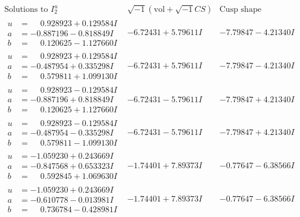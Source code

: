 \documentclass[1p]{elsarticle_modified}
\theoremstyle{definition}
\newcommand{\I}{\sqrt{-1}}
\begin{document}
$$\begin{array}{c|c|c}  
\text{Solutions to }I^u_{2}& \I (\text{vol} + \sqrt{-1}CS) & \text{Cusp shape}\\
 \hline 
\begin{aligned}
u &= \phantom{-}0.928923 + 0.129584 I \\
a &= -0.887196 - 0.818849 I \\
b &= \phantom{-}0.120625 - 1.127660 I\end{aligned}
 & -6.72431 + 5.79611 I & -7.79847 - 4.21340 I \\ \hline\begin{aligned}
u &= \phantom{-}0.928923 + 0.129584 I \\
a &= -0.487954 + 0.335298 I \\
b &= \phantom{-}0.579811 + 1.099130 I\end{aligned}
 & -6.72431 + 5.79611 I & -7.79847 - 4.21340 I \\ \hline\begin{aligned}
u &= \phantom{-}0.928923 - 0.129584 I \\
a &= -0.887196 + 0.818849 I \\
b &= \phantom{-}0.120625 + 1.127660 I\end{aligned}
 & -6.72431 - 5.79611 I & -7.79847 + 4.21340 I \\ \hline\begin{aligned}
u &= \phantom{-}0.928923 - 0.129584 I \\
a &= -0.487954 - 0.335298 I \\
b &= \phantom{-}0.579811 - 1.099130 I\end{aligned}
 & -6.72431 - 5.79611 I & -7.79847 + 4.21340 I \\ \hline\begin{aligned}
u &= -1.059230 + 0.243669 I \\
a &= -0.847568 + 0.653323 I \\
b &= \phantom{-}0.592845 + 1.069630 I\end{aligned}
 & -1.74401 + 7.89373 I & -0.77647 - 6.38566 I \\ \hline\begin{aligned}
u &= -1.059230 + 0.243669 I \\
a &= -0.610778 - 0.013981 I \\
b &= \phantom{-}0.736784 - 0.428981 I\end{aligned}
 & -1.74401 + 7.89373 I & -0.77647 - 6.38566 I \\ \hline\begin{aligned}

\end{aligned}
\end{array}$$
\end{document}
